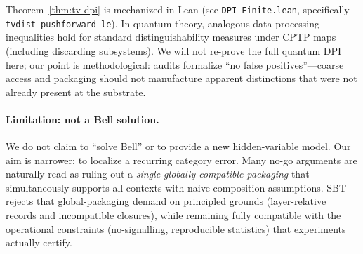 Theorem~\ref{thm:tv-dpi} is mechanized in Lean (see \texttt{DPI\_Finite.lean}, specifically \texttt{tvdist\_pushforward\_le}).
In quantum theory, analogous data-processing inequalities hold for standard distinguishability measures under CPTP maps (including discarding subsystems).\cite{Lindblad1975EntropyIneq}
We will not re-prove the full quantum DPI here; our point is methodological:
audits formalize ``no false positives''---coarse access and packaging should not manufacture apparent distinctions that were not already present at the substrate.

\paragraph{Limitation: not a Bell solution.}
We do not claim to ``solve Bell'' or to provide a new hidden-variable model.
Our aim is narrower: to localize a recurring category error.
Many no-go arguments are naturally read as ruling out a \emph{single globally compatible packaging} that simultaneously supports all contexts with naive composition assumptions.
SBT rejects that global-packaging demand on principled grounds (layer-relative records and incompatible closures), while remaining fully compatible with the operational constraints (no-signalling, reproducible statistics) that experiments actually certify.
